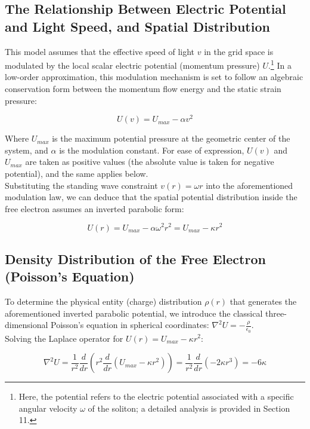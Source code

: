 \documentclass[12pt, a4paper]{article}
\begin{document}
\subsection{The Relationship Between Electric Potential and Light Speed, and Spatial Distribution}

This model assumes that the effective speed of light $v$ in the grid space is modulated by the local scalar electric potential (momentum pressure) $U$.\footnote{Here, the potential refers to the electric potential associated with a specific angular velocity $\omega$ of the soliton; a detailed analysis is provided in Section 11.} In a low-order approximation, this modulation mechanism is set to follow an algebraic conservation form between the momentum flow energy and the static strain pressure:

\begin{equation}
U(v) = U_{max} - \alpha v^2 
\end{equation}

Where $U_{max}$ is the maximum potential pressure at the geometric center of the system, and $\alpha$ is the modulation constant. For ease of expression, $U(v)$ and $U_{max}$ are taken as positive values (the absolute value is taken for negative potential), and the same applies below.\\
Substituting the standing wave constraint $v(r) = \omega r$ into the aforementioned modulation law, we can deduce that the spatial potential distribution inside the free electron assumes an inverted parabolic form:

\begin{equation}
U(r) = U_{max} - \alpha \omega^2 r^2 = U_{max} - \kappa r^2 
\end{equation}

\subsection{Density Distribution of the Free Electron (Poisson's Equation)}

To determine the physical entity (charge) distribution $\rho(r)$ that generates the aforementioned inverted parabolic potential, we introduce the classical three-dimensional Poisson's equation in spherical coordinates: $\nabla^2 U = -\frac{\rho}{\epsilon_0}$.\\
Solving the Laplace operator for $U(r) = U_{max} - \kappa r^2$:

\begin{equation}
\nabla^2 U = \frac{1}{r^2} \frac{d}{dr} \left( r^2 \frac{d}{dr} (U_{max} - \kappa r^2) \right) = \frac{1}{r^2} \frac{d}{dr} (-2\kappa r^3) = -6\kappa 
\end{equation}
\end{document}
